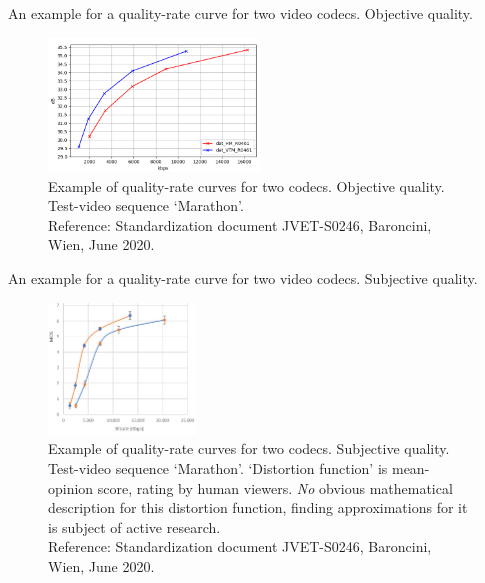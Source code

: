 \begin{frame}{An example for a quality-rate curve for two video codecs. Objective quality.}
\begin{figure}
\centering
\includegraphics[width=0.50\textwidth]{RD_IV/Marathon_Obj_Ausschnitt.png}
\captionsetup{labelformat=empty}
\caption{Example of quality-rate curves for two codecs. Objective quality. Test-video sequence `Marathon'.
\\
Reference: Standardization document  JVET-S0246, Baroncini, Wien, June 2020. 
}
\end{figure}
\end{frame}



\begin{frame}{An example for a quality-rate curve for two video codecs. Subjective quality.}
\begin{figure}
\centering
\includegraphics[width=0.35\textwidth]{RD_IV/MarathonSubj_Ausschnitt.png}
\captionsetup{labelformat=empty}
\caption{Example of quality-rate curves for two codecs. Subjective quality. Test-video sequence `Marathon'. `Distortion function' 
is mean-opinion score,  rating by human viewers.  \textit{No} obvious mathematical description for this distortion function, finding
approximations for it is subject of active research. %
\\
Reference: Standardization document  JVET-S0246, Baroncini, Wien, June 2020. 
 }
\end{figure}
\end{frame}



